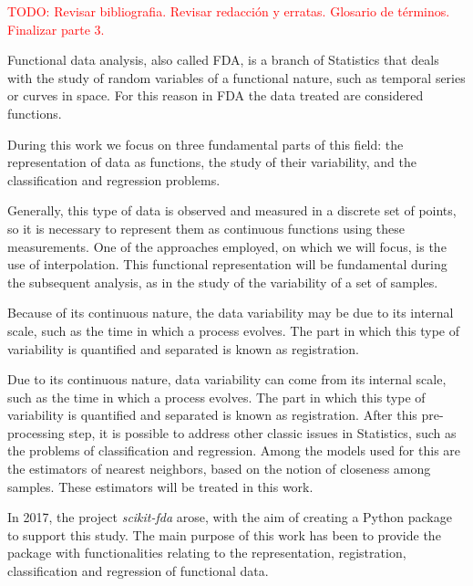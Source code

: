 \textcolor{red}{TODO: Revisar bibliografia. Revisar redacción y erratas. Glosario de términos. Finalizar parte 3.}

Functional data analysis, also called FDA, is a branch of Statistics that deals
with the study of random variables of a functional nature, such as temporal
series or curves in space. For this reason in FDA the data treated are
considered functions.

During this work we focus on three fundamental parts of this field:
the representation of data as functions, the study of their variability,
and the classification and regression problems.

Generally, this type of data is observed and measured in a discrete set of
points, so it is necessary to represent them as continuous functions using
these measurements. One of the approaches employed, on which we will focus, is the
use of interpolation. This functional representation will be fundamental during
the subsequent analysis, as in the study of the variability of a set of samples.

Because of its continuous nature, the data variability may be due to its
internal scale, such as the time in which a process evolves.
The part in which this type of variability is quantified and separated is known
as registration.

Due to its continuous nature, data variability can come from its internal scale,
such as the time in which a process evolves. The part in which this
type of variability is quantified and separated is known as registration.
After this pre-processing step, it is possible to address other classic
issues in Statistics, such as the problems of classification and regression.
Among the models used for this are the estimators of nearest neighbors,
based on the notion of closeness among samples. These estimators
will be treated in this work.

In 2017, the project \textit{scikit-fda} arose, with the aim of creating a
Python package to support this study. The main purpose of this work has been to
provide the package with functionalities relating to the representation,
registration, classification and regression of functional data.
